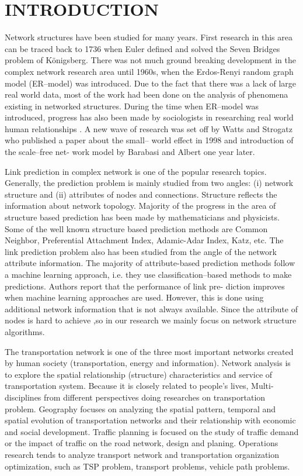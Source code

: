 \documentclass[onecolumn,preprintnumbers,amsmath,amssymb]{revtex4}
\begin{document}
\section*{INTRODUCTION\protect}
Network structures have been studied for many years. First research in this area can be traced back to 1736 when Euler defined and solved the Seven Bridges problem of Königsberg\cite{GTC}. There was not much ground breaking development in the complex network research area until 1960s, when the Erdos-Renyi random graph model (ER–model) was introduced. Due to the fact that there was a lack of large real world data, most of the work had been done on the  analysis of phenomena existing in networked structures. During the time when ER–model was introduced, progress has also been made by sociologists in researching real world human relationships . A new wave of research was set off by Watts and Strogatz who published a paper about the small– world effect in 1998 and introduction of the scale–free net- work model by Barabasi and Albert one year later.

Link prediction in complex network is one of the popular research topics. Generally, the prediction problem is mainly studied from two angles: (i) network structure and (ii) attributes of nodes and connections. Structure reflects the information about network topology. Majority of the progress in the area of structure based prediction has been made by mathematicians and physicists. Some of the well known structure based prediction methods are Common Neighbor, Preferential Attachment Index, Adamic-Adar Index, Katz, etc. The link prediction problem also has been studied from the angle of the network attribute information. The majority of attribute-based prediction methods follow a machine learning approach, i.e. they use classification–based methods to make predictions. Authors \cite{LPU,NPA,LPC,WWC,SRM} report that the performance of link pre- diction improves when machine learning approaches are used. However, this is done using additional network information that is not always available. Since the attribute of nodes is hard to achieve ,so in our research we mainly focus on network structure algorithms.

The transportation network is one of the three most important networks created by human society (transportation, energy and information). Network analysis is to explore the spatial relationship (structure) characteristics and service  of transportation system. Because it is closely related to people's lives, Multi-disciplines from different perspectives doing researches on transportation problem.
Geography focuses on analyzing the spatial pattern, temporal and spatial evolution of transportation networks and their relationship with economic and social development\cite{GME,GOT}. Traffic planning is focused on the study of traffic demand or the impact of traffic on the road network, design and planing\cite{UTN}. Operations research tends to analyze transport network and transportation organization optimization, such as TSP problem, transport problems, vehicle path problems.
\end{document}
